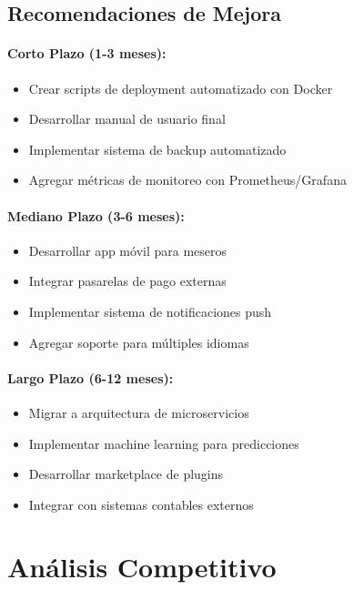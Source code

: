 \documentclass[12pt,a4paper]{article}
\begin{document}
\subsection{Recomendaciones de Mejora}

\paragraph{Corto Plazo (1-3 meses):}
\begin{itemize}
    \item Crear scripts de deployment automatizado con Docker
    \item Desarrollar manual de usuario final
    \item Implementar sistema de backup automatizado
    \item Agregar métricas de monitoreo con Prometheus/Grafana
\end{itemize}

\paragraph{Mediano Plazo (3-6 meses):}
\begin{itemize}
    \item Desarrollar app móvil para meseros
    \item Integrar pasarelas de pago externas
    \item Implementar sistema de notificaciones push
    \item Agregar soporte para múltiples idiomas
\end{itemize}

\paragraph{Largo Plazo (6-12 meses):}
\begin{itemize}
    \item Migrar a arquitectura de microservicios
    \item Implementar machine learning para predicciones
    \item Desarrollar marketplace de plugins
    \item Integrar con sistemas contables externos
\end{itemize}

\section{Análisis Competitivo}
\end{document}
